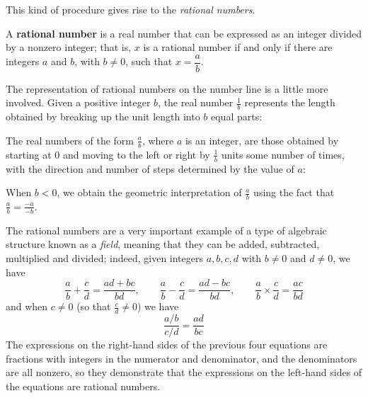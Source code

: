 This kind of procedure gives rise to the \textit{rational numbers}.
\begin{definition}
\label{defRationalNumberInformal}
A \textbf{rational number} is a real number that can be expressed as an integer divided by a nonzero integer; that is, $x$ is a rational number if and only if there are integers $a$ and $b$, with $b \ne 0$, such that $x = \dfrac{a}{b}$.

The representation of rational numbers on the number line is a little more involved. Given a positive integer $b$, the real number $\frac{1}{b}$ represents the length obtained by breaking up the unit length into $b$ equal parts:
\begin{center}
\end{center}
The real numbers of the form $\frac{a}{b}$, where $a$ is an integer, are those obtained by starting at $0$ and moving to the left or right by $\frac{1}{b}$ units some number of times, with the direction and number of steps determined by the value of $a$:

\begin{center}
\end{center}

When $b<0$, we obtain the geometric interpretation of $\frac{a}{b}$ using the fact that $\frac{a}{b}=\frac{-a}{-b}$.
\end{definition}

The rational numbers are a very important example of a type of algebraic structure known as a \textit{field}, meaning that they can be added, subtracted, multiplied and divided; indeed, given integers $a,b,c,d$ with $b \ne 0$ and $d \ne 0$, we have
\[ \frac{a}{b} + \frac{c}{d} = \frac{ad+bc}{bd}, \qquad \frac{a}{b} - \frac{c}{d} = \frac{ad-bc}{bd}, \qquad \frac{a}{b} \times \frac{c}{d} = \frac{ac}{bd} \]
and when $c \ne 0$ (so that $\frac{c}{d} \ne 0$) we have
\[ \frac{a/b}{c/d} = \frac{ad}{bc} \]
The expressions on the right-hand sides of the previous four equations are fractions with integers in the numerator and denominator, and the denominators are all nonzero, so they demonstrate that the expressions on the left-hand sides of the equations are rational numbers.

